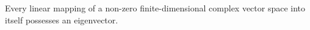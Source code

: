 Every linear mapping of a non-zero finite-dimensional complex vector space into itself possesses an eigenvector.
